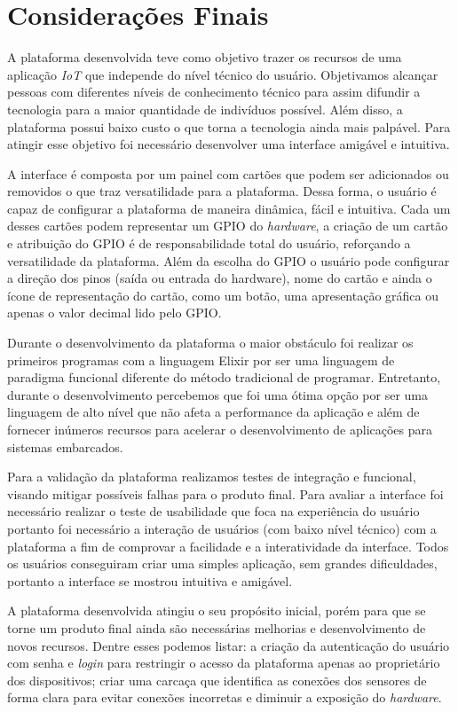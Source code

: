 \documentclass[../../layout.tex]{subfiles}
\begin{document}
\chapter{Considerações Finais}
\hspace*{3em}A plataforma desenvolvida teve como objetivo trazer os recursos de uma aplicação \emph{IoT} que independe do nível técnico do usuário. Objetivamos alcançar pessoas com diferentes níveis de conhecimento técnico para assim difundir a tecnologia para a maior quantidade de indivíduos possível. Além disso, a plataforma possui baixo custo o que torna a tecnologia ainda mais palpável. Para atingir esse objetivo foi necessário desenvolver uma interface amigável e intuitiva.\par
A interface é composta por um painel com cartões que podem ser adicionados ou removidos o que traz versatilidade para a plataforma. Dessa forma, o usuário é capaz de configurar a plataforma de maneira dinâmica, fácil e intuitiva. Cada um desses cartões podem representar um GPIO do \emph{hardware}, a criação de um cartão e atribuição do GPIO é de responsabilidade total do usuário, reforçando a versatilidade da plataforma. Além da escolha do GPIO o usuário pode configurar a direção dos pinos (saída ou entrada do hardware), nome do cartão e ainda o ícone de representação do cartão, como um botão, uma apresentação gráfica ou apenas o valor decimal lido pelo GPIO.\par
Durante o desenvolvimento da plataforma o maior obstáculo foi realizar os primeiros programas com a linguagem Elixir por ser uma linguagem de paradigma funcional diferente do método tradicional de programar. Entretanto, durante o desenvolvimento percebemos que foi uma ótima opção por ser uma linguagem de alto nível que não afeta a performance da aplicação e além de fornecer inúmeros recursos para acelerar o desenvolvimento de aplicações para sistemas embarcados.\par
Para a validação da plataforma realizamos testes de integração e funcional, visando mitigar possíveis falhas para o produto final. Para avaliar a interface foi necessário realizar o teste de usabilidade que foca na experiência do usuário  portanto foi necessário a interação de usuários (com baixo nível técnico) com a plataforma a fim de comprovar a facilidade e a interatividade da interface. Todos os usuários conseguiram criar uma simples aplicação, sem grandes dificuldades, portanto a interface se mostrou  intuitiva e amigável.\par
A plataforma desenvolvida atingiu o seu propósito inicial, porém para que se torne um produto final ainda são necessárias melhorias e desenvolvimento de novos recursos. Dentre esses podemos listar: a criação da autenticação do usuário com senha e \emph{login} para restringir o acesso da plataforma apenas ao proprietário dos dispositivos; criar uma carcaça que identifica as conexões dos sensores de forma clara para evitar conexões incorretas e diminuir a exposição do \emph{hardware}.\par 
\end{document}
